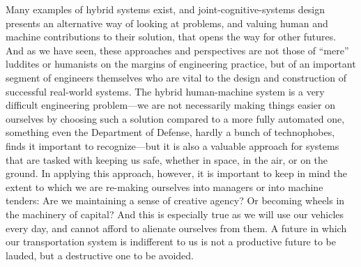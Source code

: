 Many examples of hybrid systems exist, and joint-cognitive-systems
design presents an alternative way of looking at problems, and valuing
human and machine contributions to their solution, that opens the way
for other futures. And as we have seen, these approaches and
perspectives are not those of ``mere'' luddites or humanists on the
margins of engineering practice, but of an important segment of
engineers themselves who are vital to the design and construction of
successful real-world systems. The hybrid human-machine system is a
very difficult engineering problem---we are not necessarily making
things easier on ourselves by choosing such a solution compared to a
more fully automated one, something even the Department of Defense,
hardly a bunch of technophobes, finds it important to recognize---but
it is also a valuable approach for 
systems that are tasked with keeping us safe, whether in space, in the
air, or on the ground. In applying this approach, however, it is
important to keep in mind the extent to which we are re-making
ourselves into managers or into machine tenders:  Are we maintaining a sense of
creative agency? Or becoming wheels in the machinery of capital? And
this is especially true as we will use our 
vehicles every day, and cannot afford to alienate ourselves from them.
A future in which our transportation system is indifferent to us is
not a productive future to be lauded, but a destructive one to be
avoided. 

